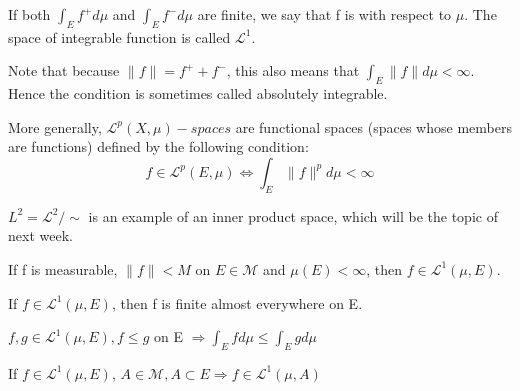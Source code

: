 \documentclass[11pt]{scrartcl}
\begin{document}
\begin{definition}
If both $\int_E f^+ d\mu$ and $\int_E f^- d\mu$ are finite, we say that f is  with respect to $\mu$. The space of integrable function is called $\mathscr{L}^1$.
\end{definition}

\begin{remark}
Note that because $\|f\| = f^+ + f^-$, this also means that $\int_E \|f\| d\mu < \infty$. Hence the condition is sometimes called absolutely integrable.
\end{remark}

\begin{definition}
More generally, $\mathscr{L}^p(X,\mu)-spaces$ are functional spaces (spaces whose members are functions) defined by the following condition: $$f \in \mathscr{L}^p(E,\mu) \Leftrightarrow \int_E \|f\|^p d\mu < \infty$$
\end{definition}
\begin{remark}
$L^2 = \mathscr{L}^2/\sim$  is an example of an inner product space, which will be the topic of next week.
\end{remark}

\begin{exercise}
If f is measurable, $\|f\|<M$ on $E\in \mathcal{M}$ and $\mu(E)<\infty$, then $f\in \mathscr{L}^1(\mu,E)$.
\end{exercise}

\begin{exercise}
If $f \in \mathscr{L}^1(\mu,E)$, then f is finite almost everywhere on E.
\end{exercise}

\begin{exercise}
$f,g \in \mathscr{L}^1(\mu,E), f\leq g $ on E $\Rightarrow \int_E f d\mu \le \int_E g d\mu $ 
\end{exercise}

\begin{exercise}
If $f \in \mathscr{L}^1(\mu,E)$, $A\in \mathcal{M}, A\subset E \Rightarrow f\in \mathscr{L}^1(\mu,A)$
\end{exercise}
\end{document}
